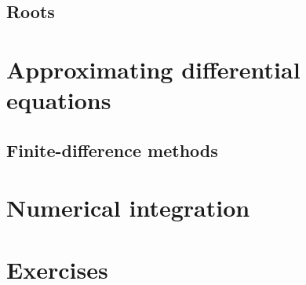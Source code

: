 \subsection{Roots}

\section{Approximating differential equations}
\subsection{Finite-difference methods}

\section{Numerical integration}

\section{Exercises}
\begin{ExerciseList}
\end{ExerciseList}
